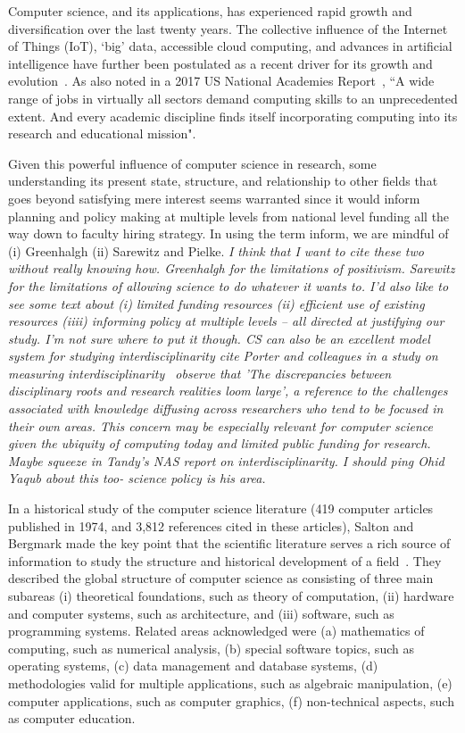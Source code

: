 Computer science, and its applications, has experienced rapid growth and diversification over the last twenty years. The collective influence of the Internet of Things (IoT), `big' data, accessible cloud computing, and advances in artificial intelligence have further been postulated as a recent driver for its growth and evolution~\cite{siebel2019_digital}. As also noted in a 2017 US National Academies Report~\cite{nas_2017}, ``A wide range of jobs in virtually all sectors demand computing skills to an unprecedented extent. And every academic discipline finds itself incorporating computing into its research and educational mission".

Given this powerful influence of computer science in research, some understanding its present state, structure, and relationship to other fields that goes beyond satisfying mere interest seems warranted since it would inform planning and policy making at multiple levels from national level funding all the way down to faculty hiring strategy. In using the term inform, we are mindful of (i) Greenhalgh (ii) Sarewitz and Pielke. \emph{I think that I want to cite these two without really knowing how. Greenhalgh for the limitations of positivism. Sarewitz for the limitations of allowing science to do whatever it wants to. I'd also like to see some text about (i) limited funding resources (ii) efficient use of existing resources (iiii) informing policy at multiple levels -- all directed at justifying our study. I'm not sure where to put it though. CS can also be an excellent model system for studying interdisciplinarity cite Porter and colleagues in a study on measuring interdisciplinarity~\cite{porter_measuring_2007} observe that 'The discrepancies between disciplinary roots and research realities loom large', a reference to the challenges associated with knowledge diffusing across researchers who tend to be focused in their own areas. This concern may be especially relevant for computer science given the ubiquity of computing today and limited public funding for research. Maybe squeeze in Tandy's NAS report on interdisciplinarity. I should ping Ohid Yaqub about this too- science policy is his area.}

In a historical study of the computer science literature (419 computer articles published in 1974,  and 3,812 references cited in these articles), Salton and Bergmark made the key point that the scientific literature serves a rich source of information to study the structure and historical development of a field~\cite{salton_citation_1979}. They described the global structure of computer science as consisting of three main subareas 
(i) theoretical foundations, such as theory of computation, (ii) hardware and computer systems, such as architecture,  and (iii) software, such as programming systems.  Related areas acknowledged were  (a) mathematics of computing, such as numerical analysis, (b) special software topics, such as operating systems, (c) data management and database systems, (d) methodologies valid for multiple applications, such as algebraic manipulation, (e) computer applications, such as computer graphics, (f) non-technical aspects, such as computer education. 

